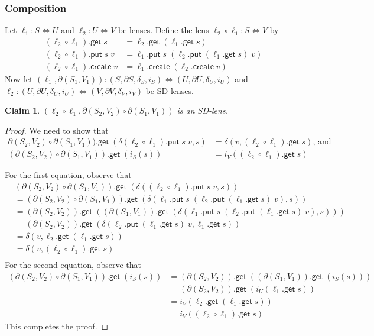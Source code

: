 \documentclass[acmsmall,review,anonymous]{acmart}\settopmatter{printfolios=true,printccs=false,printacmref=false}
\newtheorem{claim}{Claim}
\newcommand{\kw}[1]{\ensuremath{\mathsf{#1}}\xspace}
\newcommand{\get}{\ensuremath{\kw{get}}\xspace}
\newcommand{\pput}{\ensuremath{\kw{put}}\xspace}
\newcommand{\create}{\ensuremath{\kw{create}}\xspace}
\begin{document}
\subsubsection{Composition}
Let $\ell_1 : S \Leftrightarrow U$ and $\ell_2 : U \Leftrightarrow V$ be lenses.
Define the lens $\ell_2 \circ \ell_1 : S \Leftrightarrow V$ by
\begin{align*}
(\ell_2 \circ \ell_1).\get \; s &= \ell_2.\get \; (\ell_1.\get \; s)\\
(\ell_2 \circ \ell_1).\pput \; s \; v &= \ell_1.\pput \; s \; (\ell_2.\pput \;
(\ell_1.\get \; s) \; v) \\
(\ell_2 \circ \ell_1).\create \; v &= \ell_1.\create \; (\ell_2.\create \; v)
\end{align*}
Now let $(\ell_1, \partial (S_1, V_1)) : (S,
\partial S, \delta_S, i_{S}) \Leftrightarrow (U,
\partial U, \delta_U, i_{U})$ and $\ell_2 : (U,
\partial U, \delta_U, i_{U}) \Leftrightarrow (V,
\partial V, \delta_V, i_{V})$ be SD-lenses.
\begin{claim}
$(\ell_2 \circ \ell_1, \partial (S_2, V_2) \circ \partial (S_1, V_1))$ is an SD-lens.
\end{claim}
\begin{proof}
We need to show that
\begin{align}
\partial (S_2, V_2) \circ \partial (S_1, V_1)).\get \; (\delta(\ell_2 \circ
\ell_1).\pput \; s \; v, s)&= \delta(v, (\ell_2 \circ \ell_1).\get \; s)
\text{, and}\\
(\partial (S_2, V_2) \circ \partial (S_1, V_1)).\get \; (i_{S}(s)) &=
i_{V}((\ell_2 \circ \ell_1).\get \; s)
\end{align}

For the first equation, observe that
\begin{align*}
&(\partial (S_2, V_2) \circ \partial (S_1, V_1)).\get \; (\delta((\ell_2 \circ
\ell_1).\pput \; s \; v, s))\\
&=(\partial (S_2, V_2) \circ \partial (S_1, V_1)).\get \; (\delta(\ell_1.\pput
\; s \; (\ell_2.\pput \; (\ell_1.\get \; s) \; v), s))\\
&= (\partial (S_2, V_2)).\get \; ((\partial (S_1, V_1)).\get \; (\delta(\ell_1.\pput \;
s \; (\ell_2.\pput \; (\ell_1.\get \; s) \; v), s)))\\
&= (\partial (S_2, V_2)).\get \; (\delta(\ell_2.\pput \; (\ell_1.\get \; s) \; v,
\ell_1.\get \; s))\\
&= \delta(v, \ell_2.\get \; (\ell_1.\get \; s))\\
&= \delta(v, (\ell_2 \circ \ell_1).\get \; s)\\
\end{align*}
For the second equation, observe that
\begin{align*}
(\partial (S_2, V_2) \circ \partial (S_1, V_1)).\get \; (i_{S}(s)) &= 
(\partial (S_2, V_2)).\get \; ((\partial (S_1, V_1)).\get \; (i_{S}(s)))\\
&= (\partial (S_2, V_2)).\get \; (i_{U}(\ell_1.\get \; s))\\
&= i_{V}(\ell_2.\get \; (\ell_1.\get \; s))\\
&= i_{V}((\ell_2
\circ \ell_1).\get \; s)
\end{align*}
This completes the proof.
\end{proof}
\end{document}
